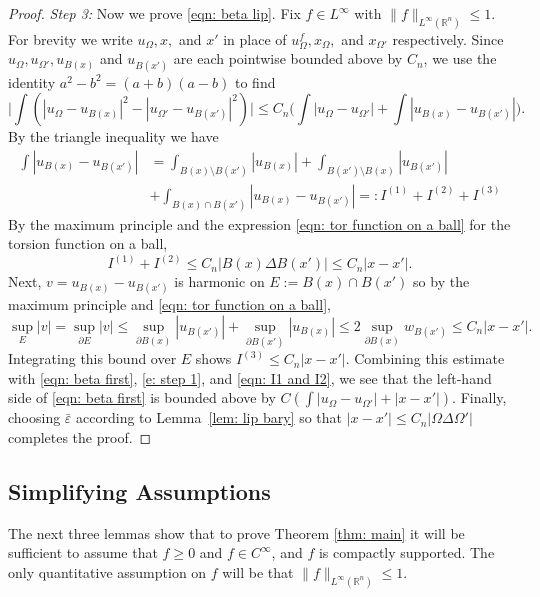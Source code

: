 \documentclass[10pt, reqno]{amsart}
\numberwithin{equation}{section}
\def\R{{\mathbb R}}
\def\e{\varepsilon}
\def\W{\Omega}
\def\baryEps{\bar{\e}}
\begin{document}
\begin{proof}
{\it Step 3:} Now we prove \eqref{eqn: beta lip}. Fix $f \in L^\infty$ with $\|f \|_{L^\infty(\R^n)}\leq 1$. For brevity we write $u_\W, x,$ and $x'$ in place of $u_{\W}^f, x_{\W},$ and $ x_{\W'}$ respectively. 
 Since $u_\W, u_{\W'}, u_{B(x)}$ and $u_{B(x')}$  are each pointwise bounded above by $C_n$, we use the identity $a^2-b^2 =(a+b)(a-b)$ to find
	\begin{equation}\label{eqn: beta first}
    \Big|  \int \left( |u_\W - u_{B(x)}|^2 - |u_{\W'} -u_{B(x')}|^2   \right) \Big|
		 \leq C_n \Big(  \int\left|u_\W - u_{\W'} \right| + \int \left| u_{B(x)} - u_{B(x')}\right| \Big).
	\end{equation}
 By the triangle inequality we have 
	\begin{equation}
		\label{e: step 1}
		\begin{split}
	\int |u_{B(x)} - u_{B(x')}| 
	&= \int_{B(x) \setminus B(x')} 	|u_{B(x)}|  + \int_{B(x') \setminus B(x)} 	|u_{B(x')} | \\
	&+ \int_{B(x)\cap B(x')} |u_{B(x)} - u_{B(x')}|  
	 =: I^{(1)} + I^{(2)} +I^{(3)} 
	 		\end{split}
		\end{equation}
By the maximum principle and the expression \eqref{eqn: tor function on a ball} for the torsion function on a ball,  \begin{equation}\label{eqn: I1 and I2}
I^{(1)} + I^{(2)} \leq C_n |B(x) \Delta B(x')| \leq C_n  |x-x'|.
\end{equation}
Next, $v= u_{B(x)} - u_{B(x')}$ is harmonic on $E:=B(x)\cap B(x')$ so by the maximum principle and \eqref{eqn: tor function on a ball},
\[
\sup_{E} |v|= \sup_{ \partial E}|v| \leq \sup_{ \partial B(x)} |u_{B(x')}| + \sup_{  \partial B(x')} |u_{B(x)}| \leq 2 \sup_{\partial B(x)} w_{B(x')} \leq C_n |x-x'|.
\]
Integrating this bound over $E$ shows $I^{(3)} \leq C_n  |x-x'|.$
Combining this estimate with \eqref{eqn: beta first}, \eqref{e: step 1}, and \eqref{eqn: I1 and I2}, we see that the left-hand side of \eqref{eqn: beta first} is bounded above by $ C( \int |u_\W - u_{\W'}| + |x - x'|).$
Finally,  choosing $\baryEps$  according to Lemma~\ref{lem: lip bary} so that $
|x-x'| \leq C_n |\W \Delta \W'| $ completes the proof.
 \end{proof}



\subsection{Simplifying Assumptions}\label{sec: simplify}
The next three lemmas show that to prove Theorem \ref{thm: main} it will be sufficient to assume that $f\geq 0$ and $f \in C^{\infty}$, and $f$ is compactly supported. The only quantitative assumption on $f$ will be that {$\| f \|_{L^{\infty}(\mathbb{R}^n)}\leq 1$.}
\end{document}
